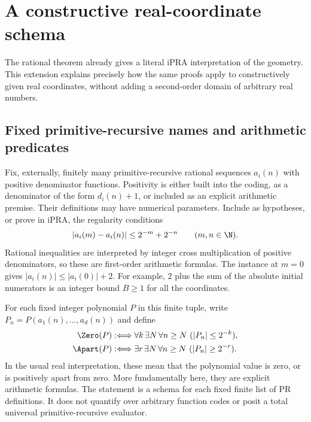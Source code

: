 \section{A constructive real-coordinate schema}\label{sec:real}

The rational theorem already gives a literal iPRA interpretation of the
geometry. This extension explains precisely how the same proofs apply
to constructively given real coordinates, without adding a second-order
domain of arbitrary real numbers.

\subsection{Fixed primitive-recursive names and arithmetic predicates}
Fix, externally, finitely many primitive-recursive rational sequences
$a_i(n)$ with positive denominator functions. Positivity is either built
into the coding, as a denominator of the form $d_i(n)+1$, or included as
an explicit arithmetic premise. Their definitions may have numerical
parameters. Include as hypotheses, or prove in iPRA,
the regularity conditions
\begin{equation}\label{eq:regular}
 |a_i(m)-a_i(n)|\le2^{-m}+2^{-n}\qquad(m,n\in\N).
\end{equation}
Rational inequalities are interpreted by integer cross multiplication of
positive denominators, so these are first-order arithmetic formulas.
The instance at $m=0$ gives $|a_i(n)|\le|a_i(0)|+2$. For example,
$2$ plus the sum of the absolute initial numerators is an integer
bound $B\ge1$ for all the coordinates.

For each fixed integer polynomial $P$ in this finite tuple, write
$P_n=P(a_1(n),\ldots,a_d(n))$ and define
\begin{align}
 \Zero(P)&:\Longleftrightarrow
 \forall k\,\exists N\,\forall n\ge N\ (|P_n|\le2^{-k}),\label{eq:zero-real}\\
 \Apart(P)&:\Longleftrightarrow
 \exists r\,\exists N\,\forall n\ge N\ (|P_n|\ge2^{-r}).\label{eq:apart-real}
\end{align}
In the usual real interpretation, these mean that the polynomial value
is zero, or is positively apart from zero. More fundamentally here, they
are explicit arithmetic formulas. The statement is a schema for each
fixed finite list of PR definitions. It does not quantify over arbitrary
function codes or posit a total universal primitive-recursive evaluator.

